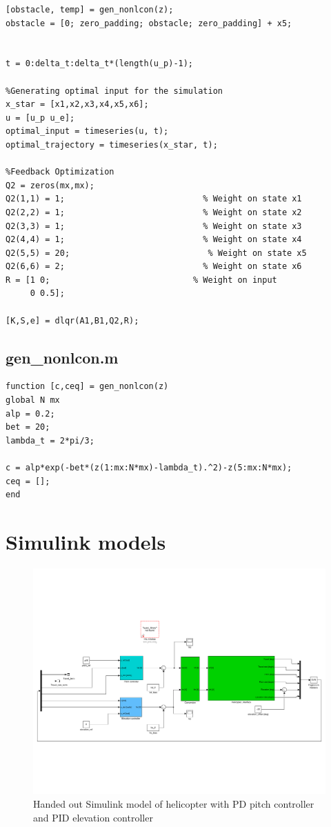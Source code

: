 \begin{verbatim}
[obstacle, temp] = gen_nonlcon(z);
obstacle = [0; zero_padding; obstacle; zero_padding] + x5;


t = 0:delta_t:delta_t*(length(u_p)-1);

%Generating optimal input for the simulation
x_star = [x1,x2,x3,x4,x5,x6];
u = [u_p u_e];
optimal_input = timeseries(u, t);
optimal_trajectory = timeseries(x_star, t);

%Feedback Optimization
Q2 = zeros(mx,mx);
Q2(1,1) = 1;                            % Weight on state x1
Q2(2,2) = 1;                            % Weight on state x2
Q2(3,3) = 1;                            % Weight on state x3
Q2(4,4) = 1;                            % Weight on state x4
Q2(5,5) = 20;                            % Weight on state x5
Q2(6,6) = 2;                            % Weight on state x6
R = [1 0;                             % Weight on input
     0 0.5];

[K,S,e] = dlqr(A1,B1,Q2,R);

\end{verbatim}

\subsection{gen\_nonlcon.m}\label{sec:nonlcon}
\begin{verbatim}
function [c,ceq] = gen_nonlcon(z)
global N mx
alp = 0.2;
bet = 20;
lambda_t = 2*pi/3;

c = alp*exp(-bet*(z(1:mx:N*mx)-lambda_t).^2)-z(5:mx:N*mx);
ceq = [];
end
\end{verbatim}




\clearpage
\section{Simulink models}\label{sec:simulink}

\begin{figure}[!htb]
	\centering
	\includegraphics[trim=10 100 10 100, clip, width=\textwidth]{figures/simulink/ex1.pdf}
	\caption{Handed out Simulink model of helicopter with PD pitch controller and PID elevation controller}
\label{fig:sim_start}
\end{figure}

